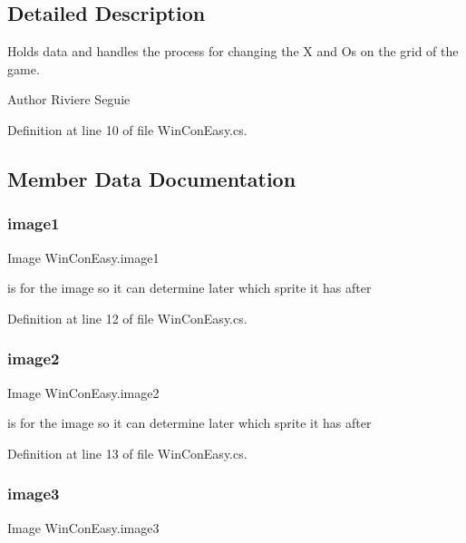 \subsection{Detailed Description}
Holds data and handles the process for changing the X and Os on the grid of the game. \begin{DoxyAuthor}{Author}
Riviere Seguie 
\end{DoxyAuthor}


Definition at line 10 of file Win\+Con\+Easy.\+cs.



\subsection{Member Data Documentation}
\mbox{\label{class_win_con_easy_aa76814d778c330ae809f88c49669d1ac}} 
\subsubsection{\texorpdfstring{image1}{image1}}
{\footnotesize\ttfamily Image Win\+Con\+Easy.\+image1}

is for the image so it can determine later which sprite it has after 

Definition at line 12 of file Win\+Con\+Easy.\+cs.

\mbox{\label{class_win_con_easy_aa1f7ca6bb50c52c27fd0a5133e1dab04}} 
\subsubsection{\texorpdfstring{image2}{image2}}
{\footnotesize\ttfamily Image Win\+Con\+Easy.\+image2}

is for the image so it can determine later which sprite it has after 

Definition at line 13 of file Win\+Con\+Easy.\+cs.

\mbox{\label{class_win_con_easy_a7e977b46ff648225ae0266455a401c1f}} 
\subsubsection{\texorpdfstring{image3}{image3}}
{\footnotesize\ttfamily Image Win\+Con\+Easy.\+image3}

